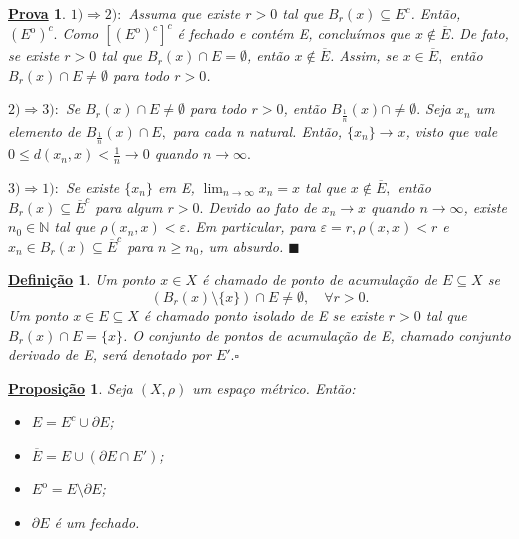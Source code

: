 \documentclass{article}
\newtheorem*{def*}{\underline{Defini\c c\~ao}}
\newtheorem*{prop*}{\underline{Proposi\c c\~ao}}
\newtheorem*{proof*}{\underline{Prova}}
\renewcommand\qedsymbol{$\blacksquare$}
\begin{document}
\begin{proof*}
  \(1) \Rightarrow 2):\) Assuma que existe \(r > 0\) tal que \(B_{r}(x)\subseteq{E^{c}}\). Então,
\(({E}^{\mathrm{o}})^{c}.\) Como \([({E}^{\mathrm{o}})^{c}]^{c}\) é fechado e contém E, concluímos que 
\(x\not\in \overline{E}.\) De fato, se existe \(r > 0\) tal que \(B_{r}(x)\cap E = \emptyset\), então \(x\not\in \overline{E}\). 
Assim, se \(x\in \overline{E},\) então \(B_{r}(x)\cap E \neq\emptyset\) para todo \(r > 0\).

  \(2)\Rightarrow 3):\) Se \(B_{r}(x)\cap E \neq\emptyset\) para todo \(r > 0\), então \(B_{\frac{1}{n}}(x)\cap \neq\emptyset.\) Seja 
 \(x_{n}\) um elemento de \(B_{\frac{1}{n}}(x)\cap E,\) para cada n natural. Então, \(\{x_{n}\}\rightarrow x\), visto que vale \(0\leq d(x_{n}, x) < \frac{1}{n}\rightarrow 0\) 
 quando \(n\rightarrow\infty.\)


  \(3) \Rightarrow 1):\) Se existe \(\{x_{n}\}\) em E, \(\lim_{n\to \infty}x_{n} = x\) tal que \(x\not\in \overline{E},\) então \(B_{r}(x)\subseteq{\overline{E}^{c}}\) 
para algum \(r>0.\) Devido ao fato de \(x_{n}\rightarrow x\) quando \(n\rightarrow \infty\), existe \(n_{0}\in \mathbb{N}\) tal que \(\rho(x_{n}, x) < \varepsilon \).
Em particular, para \(\varepsilon = r, \rho(x, x) < r\)  e \(x_{n}\in B_{r}(x)\subseteq{\overline{E}^{c}}\) para \(n\geq n_{0}\), um absurdo. \qedsymbol
\end{proof*}
\begin{def*}
  Um ponto \(x\in X\) é chamado de ponto de acumulação de \(E\subseteq{X}\) se 
    \[
      (B_{r}(x)\setminus\{x\})\cap E \neq\emptyset,\quad \forall r>0.
    \]
    Um ponto \(x\in E\subseteq{X}\) é chamado ponto isolado de E se existe \(r > 0\) tal que 
   \(B_{r}(x)\cap{E} = \{x\}\). O conjunto de pontos de acumulação de E, chamado conjunto derivado 
  de E, será denotado por \(E'. \square\)
\end{def*}
\begin{prop*}
  Seja \((X, \rho )\) um espaço métrico. Então:
 \begin{itemize}
   \item[a)] \(E = E^{c}\cup \partial E\);
   \item[b)] \(\overline{E} = E\cup (\partial E\cap E')\);
   \item[c)] \({E}^{\mathrm{o}} = E\setminus{\partial E}\);
   \item[d)] \(\partial E\) é um fechado.
 \end{itemize}
\end{prop*}
\end{document}
